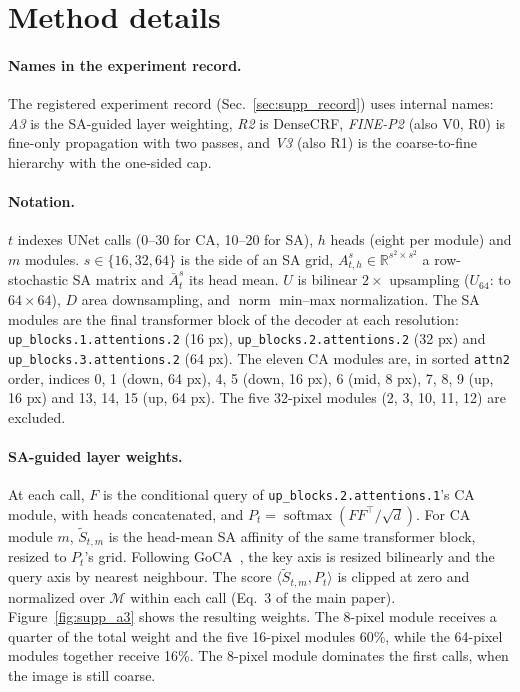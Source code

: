\section{Method details}
\label{sec:supp_method}
\paragraph{Names in the experiment record.} The registered experiment record (Sec.~\ref{sec:supp_record}) uses internal names: \emph{A3} is the SA-guided layer weighting, \emph{R2} is DenseCRF, \emph{FINE-P2} (also V0, R0) is fine-only propagation with two passes, and \emph{V3} (also R1) is the coarse-to-fine hierarchy with the one-sided cap.

\paragraph{Notation.}
$t$ indexes UNet calls (0--30 for CA, 10--20 for SA), $h$ heads (eight per module) and $m$ modules. $s\in\{16,32,64\}$ is the side of an SA grid, $A^s_{t,h}\in\mathbb R^{s^2\times s^2}$ a row-stochastic SA matrix and $\bar A^s_t$ its head mean. $U$ is bilinear $2\times$ upsampling ($U_{64}$: to $64\times64$), $D$ area downsampling, and $\operatorname{norm}$ min--max normalization. The SA modules are the final transformer block of the decoder at each resolution: \texttt{up\_blocks.1.attentions.2} (16 px), \texttt{up\_blocks.2.attentions.2} (32 px) and \texttt{up\_blocks.3.attentions.2} (64 px). The eleven CA modules are, in sorted \texttt{attn2} order, indices 0, 1 (down, 64 px), 4, 5 (down, 16 px), 6 (mid, 8 px), 7, 8, 9 (up, 16 px) and 13, 14, 15 (up, 64 px). The five 32-pixel modules (2, 3, 10, 11, 12) are excluded.

\paragraph{SA-guided layer weights.}
At each call, $F$ is the conditional query of \texttt{up\_blocks.2.attentions.1}'s CA module, with heads concatenated, and $P_t=\operatorname{softmax}(FF^\top/\sqrt d)$. For CA module $m$, $\tilde S_{t,m}$ is the head-mean SA affinity of the same transformer block, resized to $P_t$'s grid. Following GoCA~\cite{meng2026making}, the key axis is resized bilinearly and the query axis by nearest neighbour. The score $\langle\tilde S_{t,m},P_t\rangle$ is clipped at zero and normalized over $\mathcal M$ within each call (Eq.~3 of the main paper). Figure~\ref{fig:supp_a3} shows the resulting weights. The 8-pixel module receives a quarter of the total weight and the five 16-pixel modules 60\%, while the 64-pixel modules together receive 16\%. The 8-pixel module dominates the first calls, when the image is still coarse.

